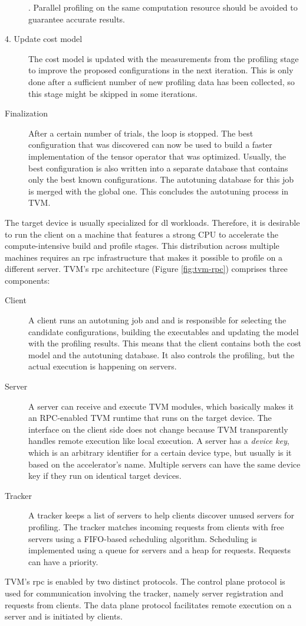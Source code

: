 \begin{description}
	. Parallel profiling on the same computation resource should be avoided to guarantee accurate results.
	\item[4. Update cost model] The cost model is updated with the measurements from the profiling stage to improve the proposed configurations in the next iteration. This is only done after a sufficient number of new profiling data has been collected, so this stage might be skipped in some iterations.
	\item[Finalization] After a certain number of trials, the loop is stopped. The best configuration that was discovered can now be used to build a faster implementation of the tensor operator that was optimized. Usually, the best configuration is also written into a separate database that contains only the best known configurations. The autotuning database for this job is merged with the global one. This concludes the autotuning process in TVM.
\end{description}

The target device is usually specialized for \gls{dl} workloads. Therefore, it is desirable to run the client on a machine that features a strong CPU to accelerate the compute-intensive build and profile stages. This distribution across multiple machines requires an \gls{rpc} infrastructure that makes it possible to profile on a different server. TVM's \gls{rpc} architecture (Figure \ref{fig:tvm-rpc}) comprises three components:
\begin{description}
	\item[Client] A client runs an autotuning job and and is responsible for selecting the candidate configurations, building the executables and updating the model with the profiling results. This means that the client contains both the cost model and the autotuning database. It also controls the profiling, but the actual execution is happening on servers.
	\item[Server] A server can receive and execute TVM modules, which basically makes it an RPC-enabled TVM runtime that runs on the target device. The interface on the client side does not change because TVM transparently handles remote execution like local execution. A server has a \textit{device key}, which is an arbitrary identifier for a certain device type, but usually is it based on the accelerator's name. Multiple servers can have the same device key if they run on identical target devices.
	\item[Tracker] A tracker keeps a list of servers to help clients discover unused servers for profiling. The tracker matches incoming requests from clients with free servers using a FIFO-based scheduling algorithm. Scheduling is implemented using a queue for servers and a heap for requests. Requests can have a priority.
\end{description}
TVM's \gls{rpc} is enabled by two distinct protocols. The control plane protocol is used for communication involving the tracker, namely server registration and requests from clients. The data plane protocol facilitates remote execution on a server and is initiated by clients.

